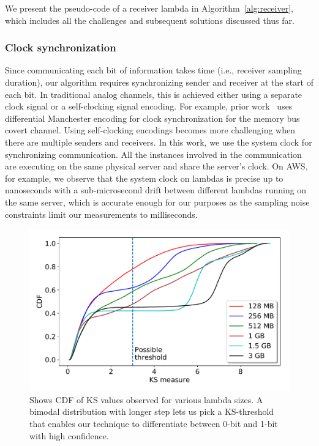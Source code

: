 We present the pseudo-code of a receiver lambda in Algorithm~\ref{alg:receiver},
which includes all the challenges and subsequent solutions discussed thus
far.

\subsubsection{Clock synchronization} 
Since communicating each bit of information takes time (i.e., receiver sampling
duration), our algorithm requires synchronizing sender and receiver at the start
of each bit. In traditional analog channels, this is achieved either using a
separate clock signal or a self-clocking signal encoding. For example, prior
work~\cite{whispers} uses differential Manchester encoding for clock
synchronization for the memory bus covert channel. Using self-clocking encodings
becomes more challenging when there are multiple senders and receivers. In this
work, we use the system clock for synchronizing communication.  All the
instances involved in the communication are executing on the same physical
server and share the server's clock. On AWS, for example, we observe that the
system clock on lambdas is precise up to nanoseconds with a sub-microsecond
drift between different lambdas running on the same server, which is accurate
enough for our purposes as the sampling noise constraints limit our measurements
to milliseconds.


\begin{figure}[!t]
  \includegraphics[width=.99\linewidth]{fig/ksvalues.pdf}
  \caption{Shows CDF of KS values observed for various lambda sizes. A bimodal distribution 
  with longer step lets us pick a KS-threshold that enables our technique to differentiate 
  between 0-bit and 1-bit with high confidence. 
\label{fig:ks_values}}
\end{figure}

